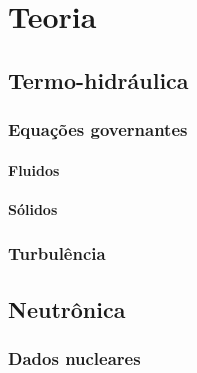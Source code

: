 \chapter{Teoria}
\label{chap:teoria}


\section{Termo-hidráulica}
\label{sec:th}

\subsection{Equações governantes}
\label{subsec:eq}

\subsubsection{Fluidos}
\label{ssubsec:fluid}

\subsubsection{Sólidos}
\label{ssubsec:solid}

\subsection{Turbulência}
\label{subsec:}

\section{Neutrônica}
\label{sec:neutronica}

\subsection{Dados nucleares}
\label{subsec:dn}


